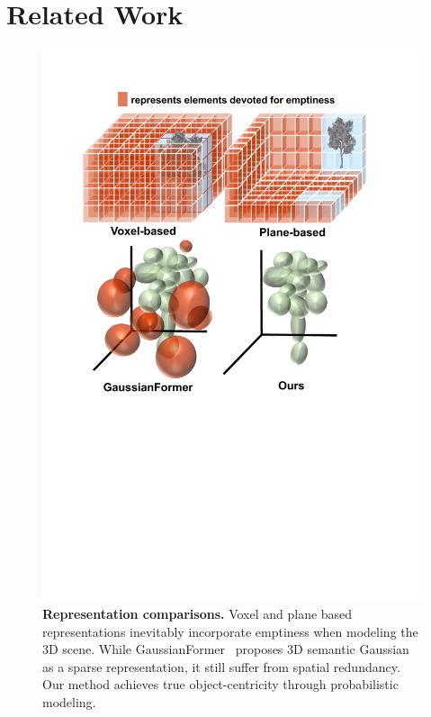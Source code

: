 \section{Related Work}
\label{sec: related work}

\begin{figure}[t]
\centering
\includegraphics[width=0.95\linewidth]{figures/motivation_1.pdf}
\vspace{-2mm}
\caption{\textbf{Representation comparisons.}
Voxel and plane based representations inevitably incorporate emptiness when modeling the 3D scene.
While GaussianFormer~\cite{huang2024gaussian} proposes 3D semantic Gaussian as a sparse representation, it still suffer from spatial redundancy.
Our method achieves true object-centricity through probabilistic modeling.
}
\label{fig:motivation}
\vspace{-7mm}
\end{figure}



